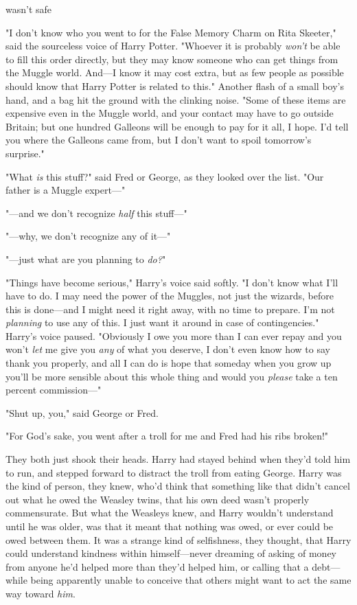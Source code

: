 {\el} wasn't safe{\el}

"I don't know who you went to for the False Memory Charm on Rita Skeeter," said
the sourceless voice of Harry Potter. "Whoever it is{\el} probably
\emph{won't} be able to fill this order directly, but they may know someone who
can get things from the Muggle world. And---I know it may cost extra, but as
few people as possible should know that Harry Potter is related to this."
Another flash of a small boy's hand, and a bag hit the ground with the clinking
noise. "Some of these items are expensive even in the Muggle world, and your
contact may have to go outside Britain; but one hundred Galleons will be enough
to pay for it all, I hope. I'd tell you where the Galleons came from, but I
don't want to spoil tomorrow's surprise."

"What \emph{is} this stuff?" said Fred or George, as they looked over the list.
"Our father is a Muggle expert\mbox{---}"

"---and we don't recognize \emph{half} this stuff\mbox{---}"

"---why, we don't recognize any of it\mbox{---}"

"---just what are you planning to \emph{do?}"

"Things have become serious," Harry's voice said softly. "I don't know what
I'll have to do. I may need the power of the Muggles, not just the wizards,
before this is done---and I might need it right away, with no time to prepare.
I'm not \emph{planning} to use any of this. I just want it around in case
of{\el} contingencies." Harry's voice paused. "Obviously I owe you more than
I can ever repay and you won't \emph{let} me give you \emph{any} of what you
deserve, I don't even know how to say thank you properly, and all I can do is
hope that someday when you grow up you'll be more sensible about this whole
thing and would you \emph{please} take a ten percent commission\mbox{---}"

"Shut up, you," said George or Fred.

"For God's sake, you went after a troll for me and Fred had his ribs broken!"

They both just shook their heads. Harry had stayed behind when they'd told him
to run, and stepped forward to distract the troll from eating George. Harry was
the kind of person, they knew, who'd think that something like that didn't
cancel out what he owed the Weasley twins, that his own deed wasn't properly
commensurate. But what the Weasleys knew, and Harry wouldn't understand until
he was older, was that it meant that nothing was owed, or ever could be owed
between them. It was a strange kind of selfishness, they thought, that Harry
could understand kindness within himself---never dreaming of asking of money
from anyone he'd helped more than they'd helped him, or calling that a
debt---while being apparently unable to conceive that others might want to act
the same way toward \emph{him}.

